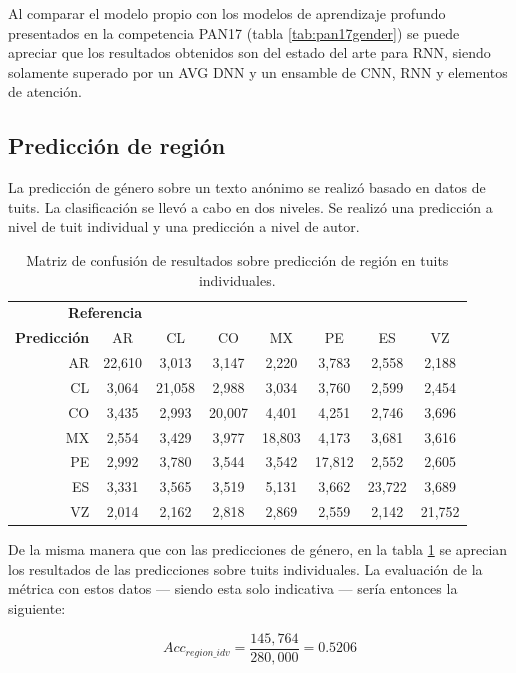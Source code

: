 Al comparar el modelo propio con los modelos de aprendizaje profundo presentados en la competencia PAN17 (tabla \ref{tab:pan17gender}) se puede apreciar que los resultados obtenidos son del estado del arte para RNN, siendo solamente superado por un AVG DNN y un ensamble de CNN, RNN y elementos de atención.

\subsection{Predicción de región}

La predicción de género sobre un texto anónimo se realizó basado en datos de tuits. La clasificación se llevó a cabo en dos niveles. Se realizó una predicción a nivel de tuit individual y una predicción a nivel de autor.

\begin{table}
\centering
\begin{tabular}{r | c c c c c c c}
\multicolumn{3}{c}{\textbf{Referencia}} \\
\textbf{Predicción} & AR & CL & CO & MX & PE & ES & VZ\\
\hline
AR & 22,610 & 3,013 & 3,147 & 2,220 & 3,783 & 2,558 & 2,188 \\
CL & 3,064 & 21,058 & 2,988 & 3,034 & 3,760 & 2,599 & 2,454 \\
CO & 3,435 & 2,993 & 20,007 & 4,401 & 4,251 & 2,746 & 3,696 \\
MX & 2,554 & 3,429 & 3,977 & 18,803 & 4,173 & 3,681 & 3,616 \\
PE & 2,992 & 3,780 & 3,544 & 3,542 & 17,812 & 2,552 & 2,605 \\
ES & 3,331 & 3,565 & 3,519 & 5,131 & 3,662 & 23,722 & 3,689 \\
VZ & 2,014 & 2,162 & 2,818 & 2,869 & 2,559 & 2,142 & 21,752 \\
\end{tabular}
\caption{Matriz de confusión de resultados sobre predicción de región en tuits individuales.}
\label{tab:region_indvtweet}
\end{table}

De la misma manera que con las predicciones de género, en la tabla \ref{tab:region_indvtweet} se aprecian los resultados de las predicciones sobre tuits individuales. La evaluación de la métrica con estos datos --- siendo esta solo indicativa --- sería entonces la siguiente:

$$ Acc_{region\_idv} = \frac{145,764}{280,000} = 0\text{.}5206 $$

